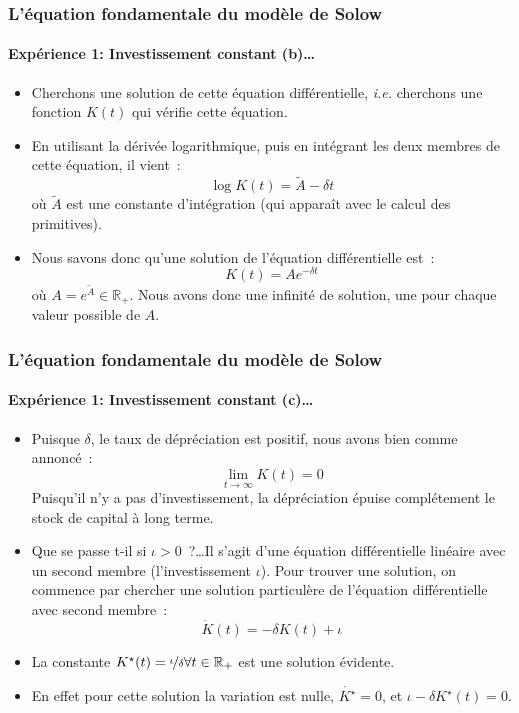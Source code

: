 \documentclass[10pt,notheorems]{beamer}
\theoremstyle{plain}
\theoremstyle{definition} %
\begin{document}
\begin{frame}
  \frametitle{L'équation fondamentale du modèle de Solow}
  \framesubtitle{Expérience 1: Investissement constant (b)\ldots}

  \bigskip

  \begin{itemize}

  \item Cherchons une solution de cette équation différentielle, \emph{i.e.} cherchons une fonction $K(t)$ qui vérifie cette équation.\newline

  \item En utilisant la dérivée logarithmique, puis en intégrant les deux membres de cette équation, il vient~:
    \[
      \log K(t) = \tilde A - \delta t
    \]
    où $\tilde A$ est une constante d'intégration (qui apparaît avec le calcul des primitives).\newline

  \item Nous savons donc qu'une solution de l'équation différentielle est~:
    \[
      K(t) = A e^{-\delta t}
    \]
    où $A = e^{\tilde A}\in\mathbb R_+$. Nous avons donc une infinité de solution, une pour chaque valeur  possible de $A$.
  \end{itemize}

\end{frame}


\begin{frame}
  \frametitle{L'équation fondamentale du modèle de Solow}
  \framesubtitle{Expérience 1: Investissement constant (c)\ldots}

  \bigskip

  \begin{itemize}

  \item Puisque $\delta$, le taux de dépréciation est positif, nous avons bien comme annoncé~:
    \[
      \lim_{t\rightarrow\infty}K(t) = 0
    \]
    Puisqu'il n'y a pas d'investissement, la dépréciation épuise complétement le stock de capital à long terme.\newline

  \item Que se passe t-il si $\iota>0$~?\ldots Il s'agit d'une équation différentielle linéaire avec un second membre (l'investissement $\iota$). Pour trouver une solution, on commence par chercher une solution particulère de l'équation différentielle avec second membre~:
    \[
      \dot K(t) = -\delta K(t) + \iota
    \]

  \item La constante $K^{\star}(t) = \nicefrac{\iota}{\delta} \forall t\in\mathbb R_+$ est une solution évidente.\newline

  \item En effet pour cette solution la variation est nulle, $\dot{K^{\star}} = 0$, et $\iota-\delta K^{\star}(t) = 0$.
  \end{itemize}

\end{frame}
\end{document}

